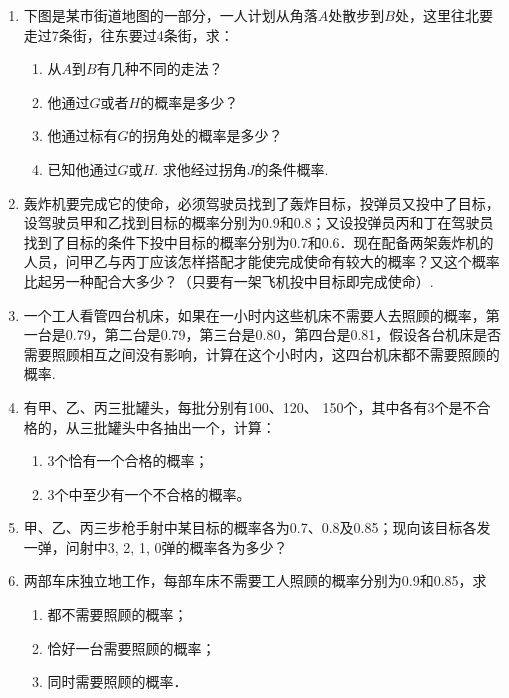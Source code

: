 \begin{enumerate}
\item 下图是某市街道地图的一部分，一人计划从角落$A$处散步到$B$处，这里往北要走过7条街，往东要过4条街，求：
\begin{enumerate}[(1)]
    \item 从$A$到$B$有几种不同的走法？
    \item 他通过$G$或者$H$的概率是多少？
    \item 他通过标有$G$的拐角处的概率是多少？
    \item 已知他通过$G$或$H$. 求他经过拐角$J$的条件概率.
\end{enumerate}

\begin{center}
\end{center}



\item 轰炸机要完成它的使命，必须驾驶员找到了轰炸目标，投弹员又投中了目标，设驾驶员甲和乙找到目标的概率分别为0.9和0.8；又设投弹员丙和丁在驾驶员找到了目标的条件下投中目标的概率分别为0.7和0.6．现在配备两架轰炸机的人员，问甲乙与丙丁应该怎样搭配才能使完成使命有较大的概率？又这个概率比起另一种配合大多少？（只要有一架飞机投中目标即完成使命）.
\item 一个工人看管四台机床，如果在一小时内这些机床不需要人去照顾的概率，第一台是0.79，第二台是0.79，第三台是0.80，第四台是0.81，假设各台机床是否需要照顾相互之间没有影响，计算在这个小时内，这四台机床都不需要照顾的概率.
\item 有甲、乙、丙三批罐头，每批分别有100、120、
150个，其中各有3个是不合格的，从三批罐头中各抽出一个，计算：
\begin{enumerate}[(1)]
\item 3个恰有一个合格的概率；
\item 3个中至少有一个不合格的概率。
\end{enumerate}

\item 甲、乙、丙三步枪手射中某目标的概率各为0.7、0.8及0.85；现向该目标各发一弹，问射中3, 2, 1, 0弹的概率各为多少？
\item 两部车床独立地工作，每部车床不需要工人照顾的概率分别为0.9和0.85，求
\begin{enumerate}[(1)]
\item 都不需要照顾的概率；
\item 恰好一台需要照顾的概率；
\item 同时需要照顾的概率．
\end{enumerate}


\end{enumerate}
